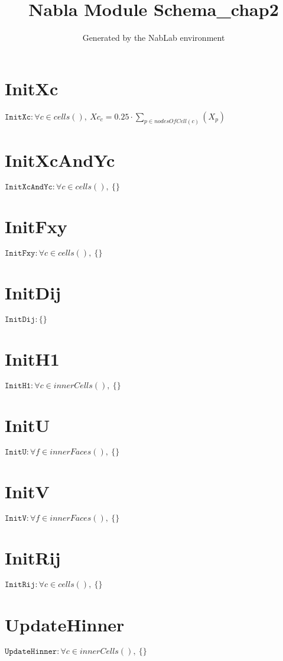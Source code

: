 \documentclass[11pt]{article}
\title{Nabla Module Schema_chap2}
\author{Generated by the NabLab environment}
\begin{document}
\maketitle


\section{InitXc}
$\texttt{InitXc} : \forall{c\in cells()}, \ Xc_{c} = 0.25 \cdot \sum_{p\in nodesOfCell(c)}\left(X_{p}\right)$


\section{InitXcAndYc}
$\texttt{InitXcAndYc} : \forall{c\in cells()}, \ \{ \}$


\section{InitFxy}
$\texttt{InitFxy} : \forall{c\in cells()}, \ \{ \}$


\section{InitDij}
$\texttt{InitDij} : \{ \}$


\section{InitH1}
$\texttt{InitH1} : \forall{c\in innerCells()}, \ \{ \}$


\section{InitU}
$\texttt{InitU} : \forall{f\in innerFaces()}, \ \{ \}$


\section{InitV}
$\texttt{InitV} : \forall{f\in innerFaces()}, \ \{ \}$


\section{InitRij}
$\texttt{InitRij} : \forall{c\in cells()}, \ \{ \}$


\section{UpdateHinner}
$\texttt{UpdateHinner} : \forall{c\in innerCells()}, \ \{ \}$
\end{document}
